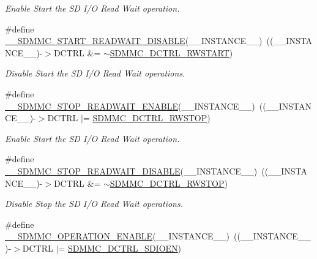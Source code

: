 \begin{DoxyCompactItemize}
\begin{DoxyCompactList}\small\item\em Enable Start the SD I/O Read Wait operation. \end{DoxyCompactList}\item 
\#define \mbox{\hyperlink{group___s_d_m_m_c___l_l___interrupt___clock_gadd96ec39161ec584cfbeb743c2e0955f}{\+\_\+\+\_\+\+S\+D\+M\+M\+C\+\_\+\+S\+T\+A\+R\+T\+\_\+\+R\+E\+A\+D\+W\+A\+I\+T\+\_\+\+D\+I\+S\+A\+B\+LE}}(\+\_\+\+\_\+\+I\+N\+S\+T\+A\+N\+C\+E\+\_\+\+\_\+)~((\+\_\+\+\_\+\+I\+N\+S\+T\+A\+N\+C\+E\+\_\+\+\_\+)-\/$>$D\+C\+T\+RL \&= $\sim$\mbox{\hyperlink{group___peripheral___registers___bits___definition_ga4302f186ec1e43bc38a4357db38fc0fa}{S\+D\+M\+M\+C\+\_\+\+D\+C\+T\+R\+L\+\_\+\+R\+W\+S\+T\+A\+RT}})
\begin{DoxyCompactList}\small\item\em Disable Start the SD I/O Read Wait operations. \end{DoxyCompactList}\item 
\#define \mbox{\hyperlink{group___s_d_m_m_c___l_l___interrupt___clock_ga1ef11b32dd9c3243b229a621fe6c0617}{\+\_\+\+\_\+\+S\+D\+M\+M\+C\+\_\+\+S\+T\+O\+P\+\_\+\+R\+E\+A\+D\+W\+A\+I\+T\+\_\+\+E\+N\+A\+B\+LE}}(\+\_\+\+\_\+\+I\+N\+S\+T\+A\+N\+C\+E\+\_\+\+\_\+)~((\+\_\+\+\_\+\+I\+N\+S\+T\+A\+N\+C\+E\+\_\+\+\_\+)-\/$>$D\+C\+T\+RL $\vert$= \mbox{\hyperlink{group___peripheral___registers___bits___definition_ga68b631bb91b55ad41472640bff5e2d34}{S\+D\+M\+M\+C\+\_\+\+D\+C\+T\+R\+L\+\_\+\+R\+W\+S\+T\+OP}})
\begin{DoxyCompactList}\small\item\em Enable Start the SD I/O Read Wait operation. \end{DoxyCompactList}\item 
\#define \mbox{\hyperlink{group___s_d_m_m_c___l_l___interrupt___clock_ga0f1ff381bd70d14433ae582539005904}{\+\_\+\+\_\+\+S\+D\+M\+M\+C\+\_\+\+S\+T\+O\+P\+\_\+\+R\+E\+A\+D\+W\+A\+I\+T\+\_\+\+D\+I\+S\+A\+B\+LE}}(\+\_\+\+\_\+\+I\+N\+S\+T\+A\+N\+C\+E\+\_\+\+\_\+)~((\+\_\+\+\_\+\+I\+N\+S\+T\+A\+N\+C\+E\+\_\+\+\_\+)-\/$>$D\+C\+T\+RL \&= $\sim$\mbox{\hyperlink{group___peripheral___registers___bits___definition_ga68b631bb91b55ad41472640bff5e2d34}{S\+D\+M\+M\+C\+\_\+\+D\+C\+T\+R\+L\+\_\+\+R\+W\+S\+T\+OP}})
\begin{DoxyCompactList}\small\item\em Disable Stop the SD I/O Read Wait operations. \end{DoxyCompactList}\item 
\#define \mbox{\hyperlink{group___s_d_m_m_c___l_l___interrupt___clock_gae827e25ed818df7dcd6110a16b72caec}{\+\_\+\+\_\+\+S\+D\+M\+M\+C\+\_\+\+O\+P\+E\+R\+A\+T\+I\+O\+N\+\_\+\+E\+N\+A\+B\+LE}}(\+\_\+\+\_\+\+I\+N\+S\+T\+A\+N\+C\+E\+\_\+\+\_\+)~((\+\_\+\+\_\+\+I\+N\+S\+T\+A\+N\+C\+E\+\_\+\+\_\+)-\/$>$D\+C\+T\+RL $\vert$= \mbox{\hyperlink{group___peripheral___registers___bits___definition_gab66312264da16d4693a3c9a9cba33c9e}{S\+D\+M\+M\+C\+\_\+\+D\+C\+T\+R\+L\+\_\+\+S\+D\+I\+O\+EN}})

\end{DoxyCompactItemize}
